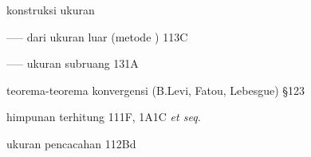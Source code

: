 





konstruksi ukuran



----- dari ukuran luar (metode \Caratheodory) 113C

----- ukuran subruang 131A






































teorema-teorema konvergensi (B.Levi, Fatou, Lebesgue) \S123









































himpunan terhitung 111F, 1A1C {\it et seq.}










ukuran pencacahan 112Bd












